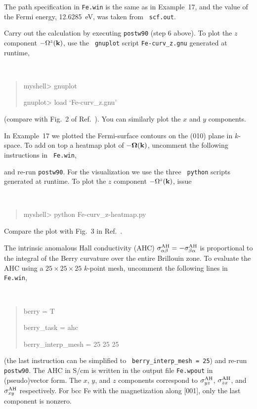 \documentclass[a4paper,11pt,twoside]{article}
\begin{document}
The path specification in {\tt Fe.win} is the same as in Example~17,
and the value of the Fermi energy, 12.6285~eV, was taken from {\tt
  scf.out}. 

Carry out the calculation by executing {\tt postw90} (step 6
above). To plot the $z$ component $-\Omega^z({\bf k})$, use the {\tt
  gnuplot} script {\tt Fe-curv\_z.gnu} generated at runtime, 
{\tt
\begin{quote}
myshell> gnuplot

gnuplot> load `Fe-curv\_z.gnu'
\end{quote} }

(compare with Fig.~2 of Ref.~\cite{yao-prl04}).  You can similarly
plot the $x$ and $y$ components.

In Example~17 we plotted the Fermi-surface contours on the (010) plane
in $k$-space.  To add on top a heatmap plot of
$-\bm{\Omega}({\bf k})$, uncomment the following instructions in {\tt
  Fe.win}, 

and re-run {\tt postw90}.  For the visualization we use the three {\tt
  python} scripts generated at runtime. To plot the $z$ component $-\Omega^z({\bf k})$, issue 
{\tt
\begin{quote}
myshell> python Fe-curv\_z-heatmap.py
\end{quote} }
\smallskip

Compare the plot with Fig.~3 in Ref.~\cite{yao-prl04}.

The intrinsic anomalous Hall conductivity (AHC) $\sigma^{\rm
  AH}_{\alpha\beta}=-\sigma^{\rm AH}_{\beta\alpha}$ is proportional to
the integral of the Berry curvature over the entire Brillouin zone.
To evaluate the AHC using a $25\times 25\times 25$ $k$-point mesh,
uncomment the following lines in {\tt Fe.win}, 
{\tt
\begin{quote}
berry = T

berry\_task = ahc                

berry\_interp\_mesh = 25 25 25

\end{quote} } 
(the last instruction can be simplified to {\tt
berry\_interp\_mesh = 25}) and re-run {\tt postw90}.  The AHC in S/cm
is written in the output file {\tt Fe.wpout} in (pseudo)vector
form. The $x$, $y$, and $z$ components correspond to $\sigma^{\rm
  AH}_{yz}$, $\sigma^{\rm AH}_{zx}$, and $\sigma^{\rm AH}_{xy}$
respectively. For bcc Fe with the magnetization along [001], only the
last component is nonzero.
\end{document}
